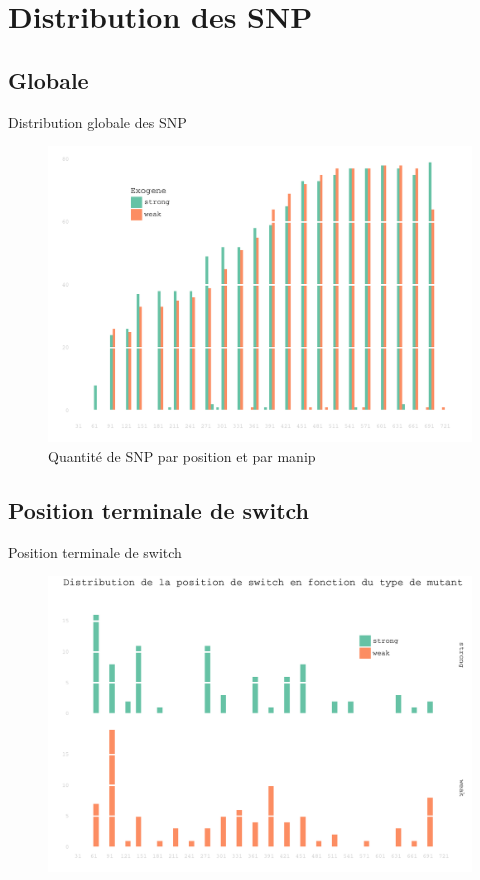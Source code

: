 \documentclass[xcolor=dvipsnames]{beamer}
\begin{document}
\section{Distribution des SNP}
\subsection{Globale}

\begin{frame}{Distribution globale des SNP}
  \begin{figure}[htbp]
    \centering
    \includegraphics[width=0.8\linewidth]{../snp_distribution.pdf}
    \caption*{Quantité de SNP par position et par manip}
  \end{figure}

\end{frame}

\subsection{Position terminale de switch}
\begin{frame}{Position terminale de switch}
  \begin{figure}[htbp]
    \centering
    \includegraphics[width=0.8\linewidth]{../switch_distrib.pdf}
  \end{figure}

\end{frame}
\end{document}
